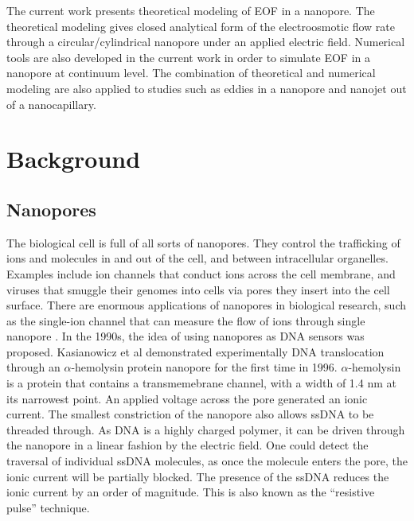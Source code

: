 The current work presents theoretical modeling of EOF in a nanopore. The theoretical modeling gives closed analytical form of the electroosmotic flow rate through a circular\//cylindrical nanopore under an applied electric field. Numerical tools are also developed in the current work in order to simulate EOF in a nanopore at continuum level. The combination of theoretical and numerical modeling are also applied to studies such as eddies in a nanopore and nanojet out of a nanocapillary.

\section{Background}
\label{intro-bkg}
\subsection{Nanopores}
The biological cell is full of all sorts of nanopores. They control the trafficking of ions and molecules in and out of the cell, and between intracellular organelles. Examples include ion channels that conduct ions across the cell membrane, and viruses that smuggle their genomes into cells via pores they insert into the cell surface. There are enormous applications of nanopores in biological research, such as the single-ion channel that can measure the flow of ions through single nanopore \cite{sakmann1983single}. In the 1990s, the idea of using nanopores as DNA sensors was proposed. Kasianowicz \cite{Kasianowicz1996} et al demonstrated experimentally DNA translocation through an $\alpha$-hemolysin protein nanopore for the first time in 1996. $\alpha$-hemolysin is a protein that contains a transmemebrane channel, with a width of 1.4 nm at its narrowest point. An applied voltage across the pore generated an ionic current. The smallest constriction of the nanopore also allows ssDNA to be threaded through. As DNA is a highly charged polymer, it can be driven through the nanopore in a linear fashion by the electric field. One could detect the traversal of individual ssDNA molecules, as once the molecule enters the pore, the ionic current will be partially blocked. The presence of the ssDNA reduces the ionic current by an order of magnitude. This is also known as the ``resistive pulse'' technique.

